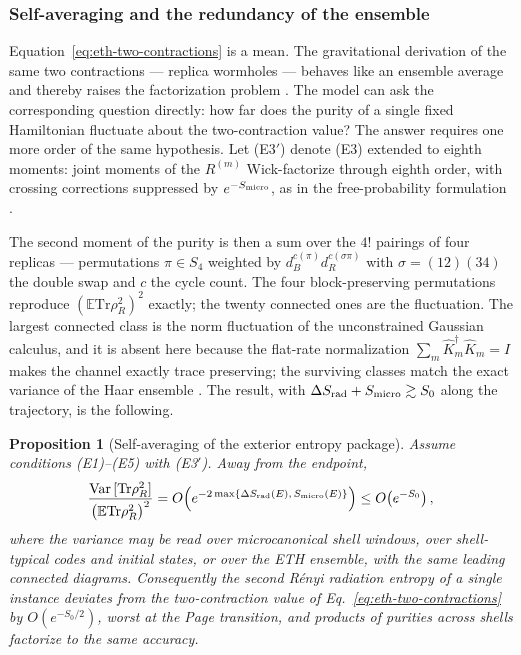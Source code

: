 \documentclass[12pt]{article}
\newcommand{\Tr}{\mathrm{Tr}}
\newcommand{\E}{\mathbb E}
\newcommand{\Smicro}{S_{\rm micro}}
\newtheorem{proposition}{Proposition}
\begin{document}
\subsubsection*{Self-averaging and the redundancy of the ensemble}

Equation~\eqref{eq:eth-two-contractions} is a mean.  The gravitational
derivation of the same two contractions --- replica wormholes --- behaves
like an ensemble average and thereby raises the factorization problem
\cite{PeningtonShenkerStanfordYang2022,MarolfMaxfield2020}.  The model can
ask the corresponding question directly: how far does the purity of a single
fixed Hamiltonian fluctuate about the two-contraction value?  The answer
requires one more order of the same hypothesis.  Let (E3$'$) denote (E3)
extended to eighth moments: joint moments of the $R^{(m)}$ Wick-factorize
through eighth order, with crossing corrections suppressed by $e^{-\Smicro}$,
as in the free-probability formulation
\cite{FoiniKurchan2019,PappalardiFoiniKurchan2022}.

The second moment of the purity is then a sum over the $4!$ pairings of four
replicas --- permutations $\pi\in S_4$ weighted by
$d_B^{c(\pi)}d_R^{c(\sigma\pi)}$ with $\sigma=(12)(34)$ the double swap and
$c$ the cycle count.  The four block-preserving permutations reproduce
$(\E\Tr\rho_R^2)^2$ exactly; the twenty connected ones are the fluctuation.
The largest connected class is the norm fluctuation of the unconstrained
Gaussian calculus, and it is absent here because the flat-rate normalization
$\sum_m\widehat K_m^\dagger\widehat K_m=I$ makes the channel exactly trace
preserving; the surviving classes match the exact variance of the Haar
ensemble \cite{Giraud2007}.  The result, with
$\Delta S_{\rm rad}+\Smicro\gtrsim S_0$ along the trajectory, is the
following.

\begin{proposition}[Self-averaging of the exterior entropy package]
\label{prop:self-averaging}
Assume conditions (E1)--(E5) with (E3$'$).  Away from the endpoint,
\begin{equation}
    \frac{{\rm Var}\,[\Tr\rho_R^2]}{\big(\E\Tr\rho_R^2\big)^2}
    =
    O\!\left(e^{-2\max\{\Delta S_{\rm rad}(E),\,\Smicro(E)\}}\right)
    \le
    O\!\left(e^{-S_0}\right),
\label{eq:self-averaging}
\end{equation}
where the variance may be read over microcanonical shell windows, over
shell-typical codes and initial states, or over the ETH ensemble, with the
same leading connected diagrams.  Consequently the second R\'enyi radiation
entropy of a single instance deviates from the two-contraction value of
Eq.~\eqref{eq:eth-two-contractions} by $O(e^{-S_0/2})$, worst at the Page
transition, and products of purities across shells factorize to the same
accuracy.
\end{proposition}
\end{document}
